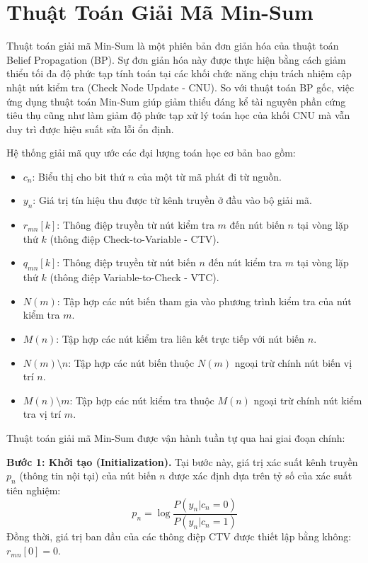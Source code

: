 \documentclass[12pt,a4paper,oneside]{book}
\begin{document}
\section{Thuật Toán Giải Mã Min-Sum}
Thuật toán giải mã Min-Sum là một phiên bản đơn giản hóa của thuật toán Belief Propagation (BP). Sự đơn giản hóa này được thực hiện bằng cách giảm thiểu tối đa độ phức tạp tính toán tại các khối chức năng chịu trách nhiệm cập nhật nút kiểm tra (Check Node Update - CNU). So với thuật toán BP gốc, việc ứng dụng thuật toán Min-Sum giúp giảm thiểu đáng kể tài nguyên phần cứng tiêu thụ cũng như làm giảm độ phức tạp xử lý toán học của khối CNU \cite{7} mà vẫn duy trì được hiệu suất sửa lỗi ổn định.

Hệ thống giải mã quy ước các đại lượng toán học cơ bản bao gồm:
\begin{itemize}
    \item $c_n$: Biểu thị cho bit thứ $n$ của một từ mã phát đi từ nguồn.
    \item $y_n$: Giá trị tín hiệu thu được từ kênh truyền ở đầu vào bộ giải mã.
    \item $r_{mn}[k]$: Thông điệp truyền từ nút kiểm tra $m$ đến nút biến $n$ tại vòng lặp thứ $k$ (thông điệp Check-to-Variable - CTV).
    \item $q_{mn}[k]$: Thông điệp truyền từ nút biến $n$ đến nút kiểm tra $m$ tại vòng lặp thứ $k$ (thông điệp Variable-to-Check - VTC).
    \item $N(m)$: Tập hợp các nút biến tham gia vào phương trình kiểm tra của nút kiểm tra $m$.
    \item $M(n)$: Tập hợp các nút kiểm tra liên kết trực tiếp với nút biến $n$.
    \item $N(m) \setminus n$: Tập hợp các nút biến thuộc $N(m)$ ngoại trừ chính nút biến vị trí $n$.
    \item $M(n) \setminus m$: Tập hợp các nút kiểm tra thuộc $M(n)$ ngoại trừ chính nút kiểm tra vị trí $m$.
\end{itemize}
Thuật toán giải mã Min-Sum được vận hành tuần tự qua hai giai đoạn chính: 

\textbf{Bước 1: Khởi tạo (Initialization).} Tại bước này, giá trị xác suất kênh truyền $p_n$ (thông tin nội tại) của nút biến $n$ được xác định dựa trên tỷ số của xác suất tiên nghiệm:
\begin{equation}
    p_n = \log \frac{P(y_n | c_n = 0)}{P(y_n | c_n = 1)}
    \label{eq:1}
\end{equation}
Đồng thời, giá trị ban đầu của các thông điệp CTV được thiết lập bằng không: $r_{mn}[0] = 0$. 
  
\end{document}
